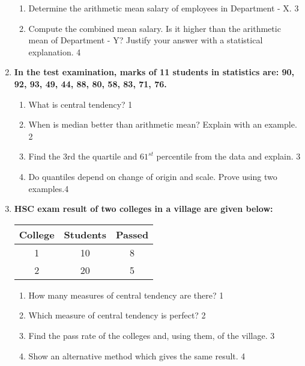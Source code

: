 \documentclass[a4paper,oneside]{book}
\begin{document}
\begin{enumerate}
  \begin{enumerate}
    \item  
	Determine the arithmetic mean salary of employees in Department - X.  \hfill 3  
    \item  
	Compute the combined mean salary. Is it higher than the arithmetic mean of Department - Y? Justify your answer with a statistical explanation.  \hfill 4  
\end{enumerate}  



    \item
  \textbf{In the test examination, marks of 11 students in statistics are: 90, 92, 93, 49, 44, 88, 80, 58, 83, 71, 76.}
  \begin{enumerate}
    \item
	What is central tendency? \hfill 1
    \item
	When is median better than arithmetic mean? Explain with an example. \hfill 2
    \item  
	Find the 3rd the quartile and $61^{st}$ percentile from the data and explain.  \hfill 3
    \item
	Do quantiles depend on change of origin and scale. Prove using two examples.\hfill 4
\end{enumerate}

 \item
	  \textbf{HSC exam result of two colleges in a village are given below:} 
	  
	  \begin{table}[h]
	  \centering
\begin{tabular}{c|c|c}
College & Students & Passed \\ \hline
1 & 10 & 8 \\ \hline
2 & 20 & 5
\end{tabular}
\end{table}
  
  \begin{enumerate}
    \item
	How many measures of central tendency are there? \hfill 1
    \item
	Which measure of central tendency is perfect? \hfill 2
    \item  
	Find the pass rate of the colleges and, using them, of the village. \hfill 3
    \item
	Show an alternative method which gives the same result. \hfill 4
  \end{enumerate}


\end{enumerate}
\end{document}
